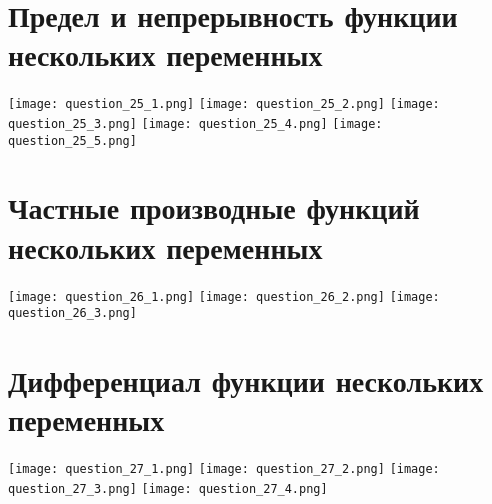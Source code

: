 \documentclass[a4paper,12pt]{article}
\begin{document}
\section{Предел и непрерывность функции нескольких переменных}
\texttt{[image: question\_25\_1.png]}
\texttt{[image: question\_25\_2.png]}
\texttt{[image: question\_25\_3.png]}
\texttt{[image: question\_25\_4.png]}
\texttt{[image: question\_25\_5.png]}

\section{Частные производные функций нескольких переменных}
\texttt{[image: question\_26\_1.png]}
\texttt{[image: question\_26\_2.png]}
\texttt{[image: question\_26\_3.png]}

\section{Дифференциал функции нескольких переменных}
\texttt{[image: question\_27\_1.png]}
\texttt{[image: question\_27\_2.png]}
\texttt{[image: question\_27\_3.png]}
\texttt{[image: question\_27\_4.png]}
\end{document}
